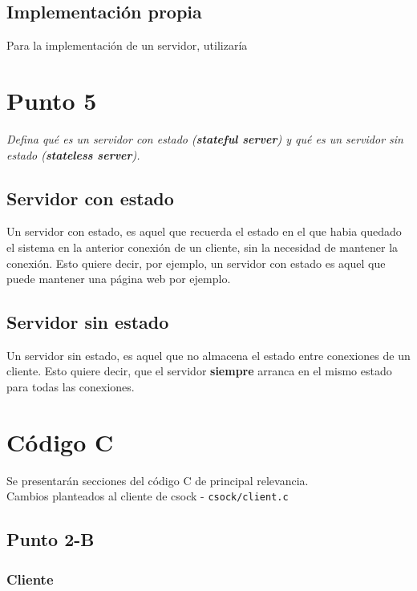 \documentclass[12pt,journal,compsoc]{IEEEtran}
\begin{document}
\subsection{Implementación propia}
Para la implementación de un servidor, utilizaría 

\section{Punto 5}
\textit{Defina qué es un servidor con estado (\textbf{stateful server}) y qué es un servidor sin estado
(\textbf{stateless server}).}\\

\subsection{Servidor con estado}
Un servidor con estado, es aquel que recuerda el estado en el que habia quedado el sistema
en la anterior conexión de un cliente, sin la necesidad de mantener la conexión.
Esto quiere decir, por ejemplo, un servidor con estado es aquel que puede mantener una 
página web por ejemplo.

\subsection{Servidor sin estado}
Un servidor sin estado, es aquel que no almacena el estado entre conexiones de un cliente.
Esto quiere decir, que el servidor \textbf{siempre} arranca en el mismo estado para todas las
conexiones.

\newpage
\onecolumn

\appendices
\section{Código C}
\label{appendixA}
Se presentarán secciones del código C de principal relevancia.\\
Cambios planteados al cliente de csock - \texttt{csock/client.c}\\

\subsection{Punto 2-B}
\label{punto2b}

\subsubsection{Cliente}
\end{document}
